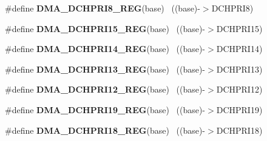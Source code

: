 \begin{DoxyCompactItemize}
\item 
\hypertarget{group___d_m_a___register___accessor___macros_ga153ed53baebe6cc47de9ed8b570fa000}{}\#define {\bfseries D\+M\+A\+\_\+\+D\+C\+H\+P\+R\+I8\+\_\+\+R\+E\+G}(base)                                    ~((base)-\/$>$D\+C\+H\+P\+R\+I8)\label{group___d_m_a___register___accessor___macros_ga153ed53baebe6cc47de9ed8b570fa000}

\item 
\hypertarget{group___d_m_a___register___accessor___macros_gaefefd1bb1505b15380efdaf93102ff38}{}\#define {\bfseries D\+M\+A\+\_\+\+D\+C\+H\+P\+R\+I15\+\_\+\+R\+E\+G}(base)                                  ~((base)-\/$>$D\+C\+H\+P\+R\+I15)\label{group___d_m_a___register___accessor___macros_gaefefd1bb1505b15380efdaf93102ff38}

\item 
\hypertarget{group___d_m_a___register___accessor___macros_gaef326ee4d58c6b5c1f49b62c331fad6c}{}\#define {\bfseries D\+M\+A\+\_\+\+D\+C\+H\+P\+R\+I14\+\_\+\+R\+E\+G}(base)                                  ~((base)-\/$>$D\+C\+H\+P\+R\+I14)\label{group___d_m_a___register___accessor___macros_gaef326ee4d58c6b5c1f49b62c331fad6c}

\item 
\hypertarget{group___d_m_a___register___accessor___macros_ga26e4fc0f7d4c5ef6cf389dc96de04c3f}{}\#define {\bfseries D\+M\+A\+\_\+\+D\+C\+H\+P\+R\+I13\+\_\+\+R\+E\+G}(base)                                  ~((base)-\/$>$D\+C\+H\+P\+R\+I13)\label{group___d_m_a___register___accessor___macros_ga26e4fc0f7d4c5ef6cf389dc96de04c3f}

\item 
\hypertarget{group___d_m_a___register___accessor___macros_ga60a8f6e66738cbce04b16280c005f52b}{}\#define {\bfseries D\+M\+A\+\_\+\+D\+C\+H\+P\+R\+I12\+\_\+\+R\+E\+G}(base)                                  ~((base)-\/$>$D\+C\+H\+P\+R\+I12)\label{group___d_m_a___register___accessor___macros_ga60a8f6e66738cbce04b16280c005f52b}

\item 
\hypertarget{group___d_m_a___register___accessor___macros_gaac861b78bd0c4e62db843509fc98a690}{}\#define {\bfseries D\+M\+A\+\_\+\+D\+C\+H\+P\+R\+I19\+\_\+\+R\+E\+G}(base)                                  ~((base)-\/$>$D\+C\+H\+P\+R\+I19)\label{group___d_m_a___register___accessor___macros_gaac861b78bd0c4e62db843509fc98a690}

\item 
\hypertarget{group___d_m_a___register___accessor___macros_ga21f3f6431b6819489acac94afa0221e3}{}\#define {\bfseries D\+M\+A\+\_\+\+D\+C\+H\+P\+R\+I18\+\_\+\+R\+E\+G}(base)                                  ~((base)-\/$>$D\+C\+H\+P\+R\+I18)\label{group___d_m_a___register___accessor___macros_ga21f3f6431b6819489acac94afa0221e3}


\end{DoxyCompactItemize}
